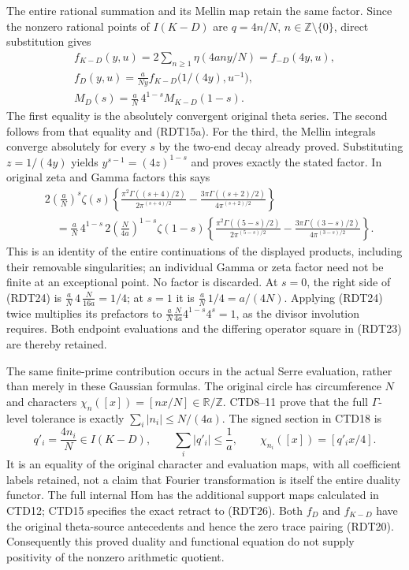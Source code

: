The entire rational summation and its Mellin map retain the same
factor. Since the nonzero rational points of $I(K-D)$ are
$q=4n/N$, $n\in\mathbb Z\setminus\{0\}$, direct substitution gives
\begin{equation}\tag{RDT24}
\begin{gathered}
f_{K-D}(y,u)=2\sum_{n\ge1}\eta(4any/N)
                       =f_{-D}(4y,u),\\
f_D(y,u)=\frac{a}{Ny}
                  f_{K-D}\bigl(1/(4y),u^{-1}\bigr),\\
M_D(s)=\frac aN\,4^{1-s}M_{K-D}(1-s).
\end{gathered}
\end{equation}
The first equality is the absolutely convergent original theta
series. The second follows from that equality and (RDT15a).
For the third, the Mellin integrals converge absolutely for every
$s$ by the two-end decay already proved. Substituting
$z=1/(4y)$ yields $y^{s-1}=(4z)^{1-s}$ and proves exactly the
stated factor. In original zeta and Gamma factors this says
\begin{equation}\tag{RDT25}
\begin{aligned}
&2\left(\frac aN\right)^s\zeta(s)
\left\{
\frac{\pi^2\Gamma((s+4)/2)}{2\pi^{(s+4)/2}}
-\frac{3\pi\Gamma((s+2)/2)}{4\pi^{(s+2)/2}}
\right\}\\
&\quad=\frac aN\,4^{1-s}\,
2\left(\frac{N}{4a}\right)^{1-s}\zeta(1-s)
\left\{
\frac{\pi^2\Gamma((5-s)/2)}{2\pi^{(5-s)/2}}
-\frac{3\pi\Gamma((3-s)/2)}{4\pi^{(3-s)/2}}
\right\}.
\end{aligned}
\end{equation}
This is an identity of the entire continuations of the displayed
products, including their removable singularities; an individual
Gamma or zeta factor need not be finite at an exceptional point.
No factor is discarded. At $s=0$, the right side of (RDT24) is
$\frac aN\,4\,\frac{N}{16a}=1/4$; at $s=1$ it is
$\frac aN\,1/4=a/(4N)$. Applying (RDT24) twice multiplies its
prefactors to
$\frac aN\frac{N}{4a}4^{1-s}4^s=1$, as the divisor involution
requires. Both endpoint evaluations and the differing operator
square in (RDT23) are thereby retained.

The same finite-prime contribution occurs in the actual Serre
evaluation, rather than merely in these Gaussian formulas.
The original circle has circumference $N$ and characters
$\chi_n([x])=[nx/N]\in\mathbb R/\mathbb Z$. CTD8--11 prove
that the full $\Gamma$-level tolerance is exactly
$\sum_i|n_i|\le N/(4a)$. The signed section in CTD18 is
\begin{equation}\tag{RDT26}
q'_i=\frac{4n_i}{N}\in I(K-D),\qquad
\sum_i|q'_i|\le\frac1a,\qquad
\chi_{n_i}([x])=[q'_ix/4].
\end{equation}
It is an equality of the original character and evaluation maps,
with all coefficient labels retained, not a claim that Fourier
transformation is itself the entire duality functor. The full
internal Hom has the additional support maps calculated in CTD12;
CTD15 specifies the exact retract to (RDT26). Both $f_D$ and
$f_{K-D}$ have the original theta-source antecedents and hence the
zero trace pairing (RDT20). Consequently this proved duality and
functional equation do not supply positivity of the nonzero
arithmetic quotient.
